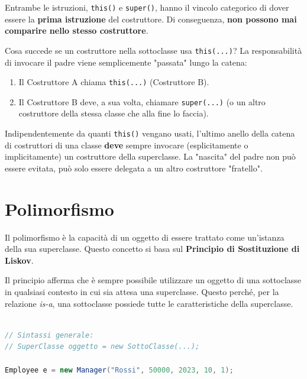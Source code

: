 \begin{warningbox}
    Entrambe le istruzioni, \texttt{this()} e \texttt{super()}, hanno il vincolo categorico di dover essere la \textbf{prima istruzione} del costruttore. Di conseguenza, \textbf{non possono mai comparire nello stesso costruttore}.
\end{warningbox}


\begin{observation}
Cosa succede se un costruttore nella sottoclasse usa \texttt{this(...)}? La responsabilità di invocare il padre viene semplicemente "passata" lungo la catena:
\begin{enumerate}
    \item Il Costruttore A chiama \texttt{this(...)} (Costruttore B).
    \item Il Costruttore B deve, a sua volta, chiamare \texttt{super(...)} (o un altro costruttore della stessa classe che alla fine lo faccia).
\end{enumerate}

Indipendentemente da quanti \texttt{this()} vengano usati, l'ultimo anello della catena di costruttori di una classe \textbf{deve} sempre invocare (esplicitamente o implicitamente) un costruttore della superclasse. La "nascita" del padre non può essere evitata, può solo essere delegata a un altro costruttore "fratello".
\end{observation}

\section{Polimorfismo}

Il polimorfismo è la capacità di un oggetto di essere trattato come un'istanza della sua superclasse. Questo concetto si basa sul \textbf{Principio di Sostituzione di Liskov}.

Il principio afferma che è sempre possibile utilizzare un oggetto di una sottoclasse in qualsiasi contesto in cui sia attesa una superclasse. Questo perché, per la relazione \textit{is-a}, una sottoclasse possiede tutte le caratteristiche della superclasse.

\begin{lstlisting}[language=Java, caption={Esempio di sostituzione}]

// Sintassi generale:
// SuperClasse oggetto = new SottoClasse(...);

Employee e = new Manager("Rossi", 50000, 2023, 10, 1);
\end{lstlisting}

